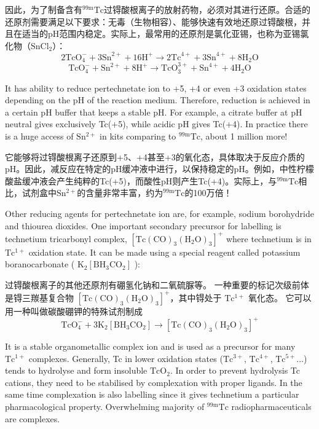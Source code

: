 \documentclass[dvipsnames, svgnames,a4paper,11pt]{article}
\begin{document}
因此，为了制备含有${}^\mathrm{99m}\mathrm{Tc}$过锝酸根离子的放射药物，必须对其进行还原。合适的还原剂需要满足以下要求：无毒（生物相容）、能够快速有效地还原过锝酸根，并且在适当的pH范围内稳定。实际上，最常用的还原剂是氯化亚锡，也称为亚锡氯化物（$\mathrm{SnCl_2}$）：
$$
      2\text{TcO}_4^- + 3\text{Sn}^{2+} + 16\text{H}^+ \rightarrow 2\text{Tc}^{4+} + 3\text{Sn}^{4+} + 8\text{H}_2\text{O}
$$
$$
      \text{TcO}_4^- + \text{Sn}^{2+} + 8\text{H}^+ \rightarrow \text{TcO}_3^{3+} + \text{Sn}^{4+} + 4\text{H}_2\text{O}
$$

It has ability to reduce pertechnetate ion to +5, +4 or even +3 oxidation states
depending on the pH of the reaction medium. Therefore, reduction is achieved in a
certain pH buffer that keeps a stable pH. For example, a citrate buffer at pH neutral
gives exclusively Tc(+5), while acidic pH gives Tc(+4). In practice there is a huge
access of $\mathrm{Sn^{2+}}$ in kits comparing to ${}^\mathrm{99m}\mathrm{Tc}$, about 1 million more!

它能够将过锝酸根离子还原到+5、+4甚至+3的氧化态，具体取决于反应介质的pH。因此，减反应在特定的pH缓冲液中进行，以保持稳定的pH。例如，中性柠檬酸盐缓冲液会产生纯粹的Tc(+5)，而酸性pH则产生Tc(+4)。实际上，与${}^\mathrm{99m}\mathrm{Tc}$相比，试剂盒中$\mathrm{Sn^{2+}}$的含量非常丰富，约为${}^\mathrm{99m}\mathrm{Tc}$的100万倍！

Other reducing agents for pertechnetate ion are, for example, sodium borohydride
and thiourea dioxides. One important secondary precursor for labelling is technetium
tricarbonyl complex, $[\text{Tc}(\text{CO})_3(\text{H}_2\text{O})_3]^+$ where technetium is in $\mathrm{Tc^{1+}}$ oxidation state. It
can be made using a special reagent called potassium boranocarbonate
( $\text{K}_2[\text{BH}_3\text{CO}_2]$ ):

过锝酸根离子的其他还原剂有硼氢化钠和二氧硫脲等。 一种重要的标记次级前体是锝三羰基复合物 $[\text{Tc}(\text{CO})_3(\text{H}_2\text{O})_3]^+$，其中锝处于 $\mathrm{Tc^{1+}}$ 氧化态。 它可以用一种叫做碳酸硼钾的特殊试剂制成
$$
      \text{TcO}_4^- + 3\text{K}_2[\text{BH}_3\text{CO}_2] \rightarrow [\text{Tc}(\text{CO})_3(\text{H}_2\text{O})_3]^+
$$

It is a stable organometallic complex ion and is used as a precursor for many $\mathrm{Tc^{1+}}$
complexes. Generally, Tc in lower oxidation states ($\mathrm{Tc^{3+}}$, $\mathrm{Tc^{4+}}$, $\mathrm{Tc^{5+}}$...) tends to
hydrolyse and form insoluble $\mathrm{TcO_2}$. In order to prevent hydrolysis Tc cations, they
need to be stabilised by complexation with proper ligands. In the same time
complexation is also labelling since it gives technetium a particular pharmacological
property. Overwhelming majority of ${}^\mathrm{99m}\mathrm{Tc}$ radiopharmaceuticals are complexes.
\end{document}
